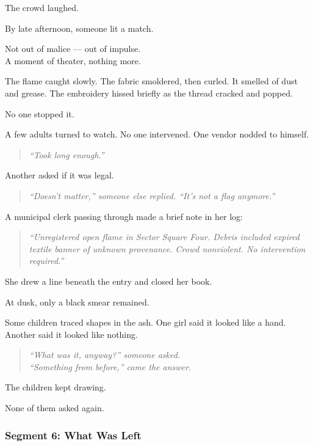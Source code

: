 \documentclass[9pt]{article}
\begin{document}
The crowd laughed.

By late afternoon, someone lit a match.

Not out of malice --- out of impulse.\\
A moment of theater, nothing more.

The flame caught slowly. The fabric smoldered, then curled. It smelled of dust and grease. The embroidery hissed briefly as the thread cracked and popped.

No one stopped it.

A few adults turned to watch. No one intervened. One vendor nodded to himself.

\begin{quote}
\textit{“Took long enough.”}
\end{quote}

Another asked if it was legal.

\begin{quote}
\textit{“Doesn’t matter,” someone else replied. “It’s not a flag anymore.”}
\end{quote}

\vspace{1em}

A municipal clerk passing through made a brief note in her log:

\begin{quote}
\textit{“Unregistered open flame in Sector Square Four. Debris included expired textile banner of unknown provenance. Crowd nonviolent. No intervention required.”}
\end{quote}

She drew a line beneath the entry and closed her book.

\vspace{1em}

At dusk, only a black smear remained.

Some children traced shapes in the ash. One girl said it looked like a hand. Another said it looked like nothing.

\begin{quote}
\textit{“What was it, anyway?” someone asked.}
\\
\textit{“Something from before,” came the answer.}
\end{quote}

The children kept drawing.

None of them asked again.

\newpage

\subsubsection*{Segment 6: What Was Left}
\end{document}
